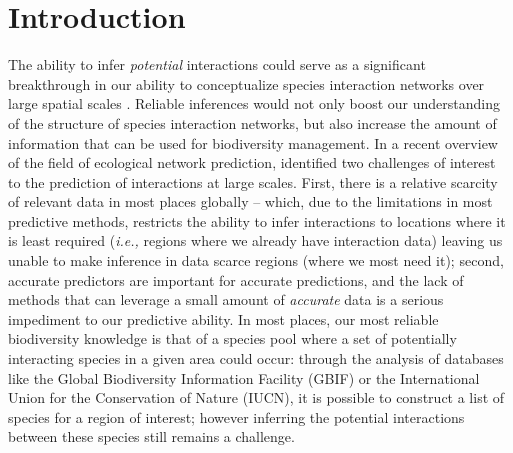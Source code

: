 \section{Introduction}

The ability to infer \emph{potential} interactions could serve as a
significant breakthrough in our ability to conceptualize species
interaction networks over large spatial scales \cite{Hortal2015Seven}.
Reliable inferences would not only boost our understanding of the
structure of species interaction networks, but also increase the amount
of information that can be used for biodiversity management. In a recent
overview of the field of ecological network prediction,
\cite{Strydom2021Roadmap} identified two challenges of interest to the
prediction of interactions at large scales. First, there is a relative
scarcity of relevant data in most places globally -- which, due to the
limitations in most predictive methods, restricts the ability to infer
interactions to locations where it is least required (\emph{i.e.,}
regions where we already have interaction data) leaving us unable to
make inference in data scarce regions (where we most need it); second,
accurate predictors are important for accurate predictions, and the lack
of methods that can leverage a small amount of \emph{accurate} data is a
serious impediment to our predictive ability. In most places, our most
reliable biodiversity knowledge is that of a species pool where a set of
potentially interacting species in a given area could occur: through the
analysis of databases like the Global Biodiversity Information Facility
(GBIF) or the International Union for the Conservation of Nature (IUCN),
it is possible to construct a list of species for a region of interest;
however inferring the potential interactions between these species still
remains a challenge.

